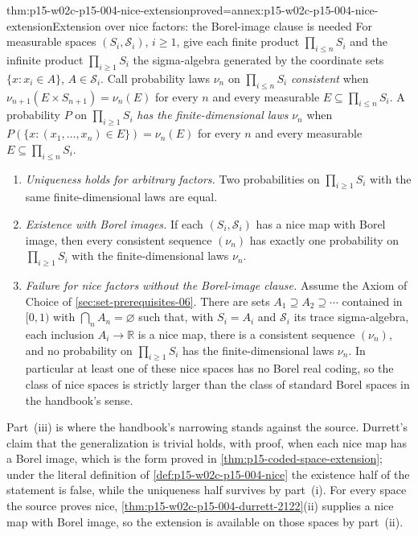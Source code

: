 \begin{hbtheorem}{thm:p15-w02c-p15-004-nice-extension}{proved=annex:p15-w02c-p15-004-nice-extension}{Extension over nice factors: the Borel-image clause is needed}
For measurable spaces \((S_i,\mathcal S_i)\), \(i\geq1\), give each finite
product \(\prod_{i\leq n}S_i\) and the infinite product
\(\prod_{i\geq1}S_i\) the sigma-algebra generated by the coordinate sets
\(\{x:x_i\in A\}\), \(A\in\mathcal S_i\). Call probability laws
\(\nu_n\) on \(\prod_{i\leq n}S_i\) \emph{consistent} when
\(\nu_{n+1}(E\times S_{n+1})=\nu_n(E)\) for every \(n\) and every
measurable \(E\subseteq\prod_{i\leq n}S_i\). A probability \(P\) on
\(\prod_{i\geq1}S_i\) \emph{has the finite-dimensional laws} \(\nu_n\)
when \(P(\{x:(x_1,\ldots,x_n)\in E\})=\nu_n(E)\) for every \(n\) and
every measurable \(E\subseteq\prod_{i\leq n}S_i\).
\begin{enumerate}
\item \emph{Uniqueness holds for arbitrary factors.} Two probabilities on
      \(\prod_{i\geq1}S_i\) with the same finite-dimensional laws are
      equal.
\item \emph{Existence with Borel images.} If each \((S_i,\mathcal S_i)\)
      has a nice map with Borel image, then every consistent sequence
      \((\nu_n)\) has exactly one probability on \(\prod_{i\geq1}S_i\)
      with the finite-dimensional laws \(\nu_n\).
\item \emph{Failure for nice factors without the Borel-image clause.}
      Assume the Axiom of Choice of \cref{sec:set-prerequisites-06}.
      There are sets \(A_1\supseteq A_2\supseteq\cdots\) contained in
      \([0,1)\) with \(\bigcap_nA_n=\varnothing\) such that, with
      \(S_i=A_i\) and \(\mathcal S_i\) its trace sigma-algebra, each
      inclusion \(A_i\to\mathbb R\) is a nice map, there is a consistent
      sequence \((\nu_n)\), and no probability on
      \(\prod_{i\geq1}S_i\) has the finite-dimensional laws \(\nu_n\).
      In particular at least one of these nice spaces has no Borel real
      coding, so the class of nice spaces is strictly larger than the
      class of standard Borel spaces in the handbook's sense.
\end{enumerate}
\end{hbtheorem}

Part~(iii) is where the handbook's narrowing stands against the source.
Durrett's claim that the generalization is trivial holds, with proof, when
each nice map has a Borel image, which is the form proved in
\cref{thm:p15-coded-space-extension}; under the literal definition of
\cref{def:p15-w02c-p15-004-nice} the existence half of the statement is
false, while the uniqueness half survives by part~(i). For every space the
source proves nice, \cref{thm:p15-w02c-p15-004-durrett-2122}(ii) supplies a
nice map with Borel image, so the extension is available on those spaces
by part~(ii).

